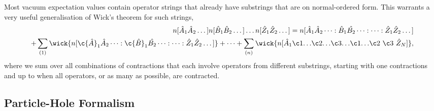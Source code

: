 		Most vacuum expectation values contain operator strings that already have substrings
		that are on normal-ordered form. This warrants a very useful generalisation of
		Wick's theorem for such strings,
		\begin{equation}
			\begin{aligned}
			n[\hat{A}_1\hat{A}_2 \dots ]
			n[\hat{B}_1\hat{B}_2 \dots ] \dots
			n[\hat{Z}_1\hat{Z}_2 \dots ]
			= n[\hat{A}_1\hat{A}_2\dots:
				\hat{B}_1\hat{B_2}\dots:
				\dots:
				\hat{Z}_1\hat{Z}_2\dots] \\
			+ \sum_{(1)}
				\wick{n[
				\c{\hat{A}}_1\hat{A}_2\dots:
				\c{\hat{B}}_1\hat{B_2}\dots:
				\dots:
				\hat{Z}_1\hat{Z}_2\dots]}
			+ \dots 
			+ \sum_{(n)}
				\wick{n[		
				\hat{A}_1 \c1{\dots} \c2{\dots} \c3{\dots} 
					\c1{\dots} \c2{\ } \c3{\ } \hat{Z}_N
				]},
			\end{aligned}
		\end{equation}
		where we sum over all combinations of contractions that each involve operators 
		from different substrings, starting with one contractions and up to when all
		operators, or as many as possible, are contracted.

    \subsection{Particle-Hole Formalism}

